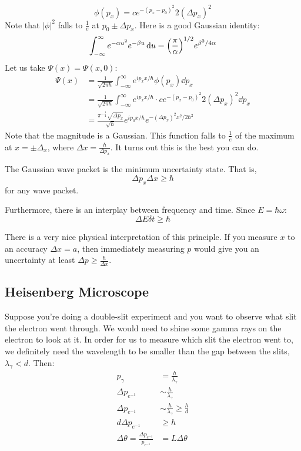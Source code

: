 \[ \phi(p_x) = c e^{-(p_x - p_0)^2}{2 (\Delta p_x)^2} \]
Note that $|\phi|^2$ falls to $\frac{1}{e}$ at $p_0 \pm \Delta p_x$. Here is a good Gaussian identity:
\[ \int_{-\infty}^{\infty} e^{-\alpha u^2} e^{-\beta u} \dd{u} = \qty(\frac{\pi}{\alpha})^{1/2} e^{\beta^2/4\alpha} \]
Let us take $\Psi(x) = \Psi(x, 0)$:
\begin{align*}
    \Psi(x) &= \frac{1}{\sqrt{2\pi\hbar}} \int_{-\infty}^{\infty} e^{i p_x x/\hbar} \phi(p_x) \dd{p_x} \\
    &= \frac{1}{\sqrt{2\pi\hbar}} \int_{-\infty}^{\infty} e^{i p_x x/\hbar} \cdot c e^{-(p_x - p_0)^2}{2 (\Delta p_x)^2} \dd{p_x} \\
    &= \frac{\pi^{-\frac{1}{4}} \sqrt{\Delta p_x}}{\sqrt{\hbar}}  e^{i p_0 x / \hbar} e^{-(\Delta p_x)^2 x^2 / 2 \hbar^2}
\end{align*}
Note that the magnitude is a Gaussian. This function falls to $\frac{1}{e}$ of the maximum at $x = \pm \Delta_x$, where
$\Delta x = \frac{\hbar}{\Delta p_x}$. It turns out this is the best you can do.

\begin{theorem}
    The Gaussian wave packet is the minimum uncertainty state. That is,
    \[ \Delta p_x \Delta x \geq \hbar \]
    for any wave packet.
\end{theorem}

Furthermore, there is an interplay between frequency and time. Since $E = \hbar \omega$:
\[ \Delta E \delta t \geq \hbar \]

There is a very nice physical interpretation of this principle. If you measure $x$ to an accuracy $\Delta x = a$, then
immediately measuring $p$ would give you an uncertainty at least $\Delta p \geq \frac{\hbar}{\Delta x}$.

\subsection{Heisenberg Microscope}
Suppose you're doing a double-slit experiment and you want to observe what slit the electron went through. We would need to shine some gamma rays
on the electron to look at it. In order for us to measure which slit the electron went to, we definitely need the wavelength to be smaller than the gap between the slits,
$\lambda_{\gamma} < d$. Then:
\begin{align*}
    p_{\gamma} &= \frac{h}{\lambda_{\gamma}} \\
    \Delta p_{e^{-1}} &\sim \frac{h}{\lambda_{\gamma}} \\
    \Delta p_{e^{-1}} &\sim \frac{h}{\lambda_{\gamma}} \geq \frac{h}{d} \\
    d \Delta p_{e^{-1}} &\geq h \\
    \Delta \theta = \frac{\Delta p_{e^{-1}}}{p_{e^{-1}}} &= L \Delta \theta
\end{align*}